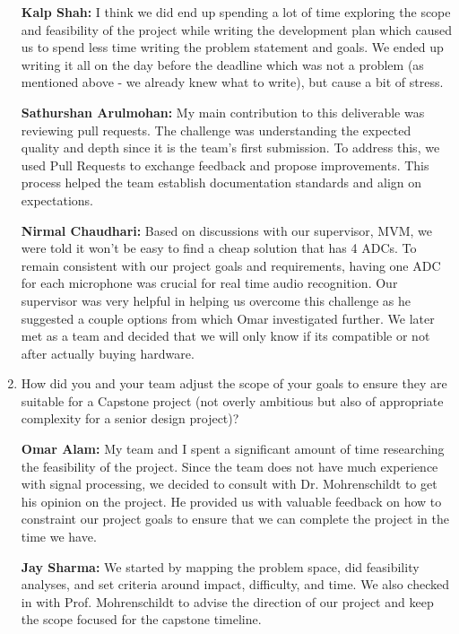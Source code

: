 \documentclass{article}
\begin{document}
\begin{enumerate}
    \textbf{Kalp Shah:} I think we did end up spending a lot of time exploring
    the scope and feasibility of the project while writing the development plan
    which caused us to spend less time writing the problem statement and goals.
    We ended up writing it all on the day before the deadline which was not a
    problem (as mentioned above - we already knew what to write), but cause a
    bit of stress.

    \textbf{Sathurshan Arulmohan:} My main contribution to this deliverable was
    reviewing pull requests. The challenge was understanding the expected
    quality and depth since it is the team's first submission. To address this,
    we used Pull Requests to exchange feedback and propose improvements. This
    process helped the team establish documentation standards and align on
    expectations.

    \textbf{Nirmal Chaudhari:} Based on discussions with our supervisor, MVM, we
    were told it won't be easy to find a cheap solution that has 4 ADCs. To
    remain consistent with our project goals and requirements, having one ADC
    for each microphone was crucial for real time audio recognition. Our
    supervisor was very helpful in helping us overcome this challenge as he
    suggested a couple options from which Omar investigated further. We later
    met as a team and decided that we will only know if its compatible or not
    after actually buying hardware. 

    \item How did you and your team adjust the scope of your goals to ensure
    they are suitable for a Capstone project (not overly ambitious but also of
    appropriate complexity for a senior design project)?

    \textbf{Omar Alam:} My team and I spent a significant amount of time
    researching the feasibility of the project. Since the team does not have
    much experience with signal processing, we decided to consult with Dr.
    Mohrenschildt to get his opinion on the project. He provided us with
    valuable feedback on how to constraint our project goals to ensure that we
    can complete the project in the time we have.
    
    \textbf{Jay Sharma:} We started by mapping the problem space, did
    feasibility analyses, and set criteria around impact, difficulty, and time.
    We also checked in with Prof. Mohrenschildt to advise the direction of our
    project and keep the scope focused for the capstone timeline.


\end{enumerate}
\end{document}
